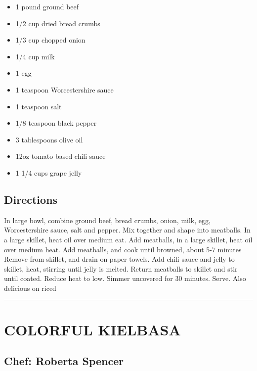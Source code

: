 \documentclass[
]{book}
\providecommand{\tightlist}{%
  \setlength{\itemsep}{0pt}\setlength{\parskip}{0pt}}
\begin{document}
\begin{itemize}
\tightlist
\item
  1 pound ground beef
\item
  1/2 cup dried bread crumbs
\item
  1/3 cup chopped onion
\item
  1/4 cup milk
\item
  1 egg
\item
  1 teaspoon Worcestershire sauce
\item
  1 teaspoon salt
\item
  1/8 teaspoon black pepper
\item
  3 tablespoons olive oil
\item
  12oz tomato based chili sauce
\item
  1 1/4 cups grape jelly
\end{itemize}

\hypertarget{directions-50}{%
\subsection*{Directions}\label{directions-50}}


In large bowl, combine ground beef, bread crumbs, onion, milk, egg, Worcestershire sauce, salt and pepper.
Mix together and shape into meatballs. In a large skillet, heat oil over medium eat. Add meatballs,
in a large skillet, heat oil over medium heat. Add meatballs, and cook until browned, about 5-7 minutes\\
Remove from skillet, and drain on paper towels. Add chili sauce and jelly to skillet, heat, stirring until
jelly is melted. Return meatballs to skillet and stir until coated. Reduce heat to low. Simmer uncovered for
30 minutes. Serve. Also delicious on riced

\begin{center}\rule{0.5\linewidth}{0.5pt}\end{center}

\hypertarget{colorful-kielbasa}{%
\section*{COLORFUL KIELBASA}\label{colorful-kielbasa}}


\hypertarget{chef-roberta-spencer-17}{%
\subsection*{Chef: Roberta Spencer}\label{chef-roberta-spencer-17}}
\end{document}
